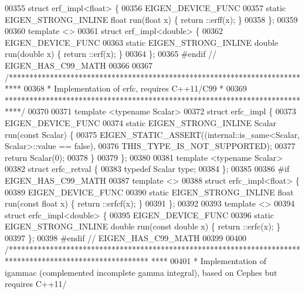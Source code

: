 \begin{DoxyCode}
00355 \textcolor{keyword}{struct }erf\_impl<float> \{
00356   EIGEN\_DEVICE\_FUNC
00357   \textcolor{keyword}{static} EIGEN\_STRONG\_INLINE \textcolor{keywordtype}{float} run(\textcolor{keywordtype}{float} x) \{ return ::erff(x); \}
00358 \};
00359 
00360 \textcolor{keyword}{template} <>
00361 \textcolor{keyword}{struct }erf\_impl<double> \{
00362   EIGEN\_DEVICE\_FUNC
00363   \textcolor{keyword}{static} EIGEN\_STRONG\_INLINE \textcolor{keywordtype}{double} run(\textcolor{keywordtype}{double} x) \{ return ::erf(x); \}
00364 \};
00365 \textcolor{preprocessor}{#endif  // EIGEN\_HAS\_C99\_MATH}
00366 
00367 \textcolor{comment}{/***************************************************************************}
00368 \textcolor{comment}{* Implementation of erfc, requires C++11/C99                               *}
00369 \textcolor{comment}{****************************************************************************/}
00370 
00371 \textcolor{keyword}{template} <\textcolor{keyword}{typename} Scalar>
00372 \textcolor{keyword}{struct }erfc\_impl \{
00373   EIGEN\_DEVICE\_FUNC
00374   \textcolor{keyword}{static} EIGEN\_STRONG\_INLINE Scalar run(\textcolor{keyword}{const} Scalar) \{
00375     EIGEN\_STATIC\_ASSERT((internal::is\_same<Scalar, Scalar>::value == \textcolor{keyword}{false}),
00376                         THIS\_TYPE\_IS\_NOT\_SUPPORTED);
00377     \textcolor{keywordflow}{return} Scalar(0);
00378   \}
00379 \};
00380 
00381 \textcolor{keyword}{template} <\textcolor{keyword}{typename} Scalar>
00382 \textcolor{keyword}{struct }erfc\_retval \{
00383   \textcolor{keyword}{typedef} Scalar type;
00384 \};
00385 
00386 \textcolor{preprocessor}{#if EIGEN\_HAS\_C99\_MATH}
00387 \textcolor{keyword}{template} <>
00388 \textcolor{keyword}{struct }erfc\_impl<float> \{
00389   EIGEN\_DEVICE\_FUNC
00390   \textcolor{keyword}{static} EIGEN\_STRONG\_INLINE \textcolor{keywordtype}{float} run(\textcolor{keyword}{const} \textcolor{keywordtype}{float} x) \{ return ::erfcf(x); \}
00391 \};
00392 
00393 \textcolor{keyword}{template} <>
00394 \textcolor{keyword}{struct }erfc\_impl<double> \{
00395   EIGEN\_DEVICE\_FUNC
00396   \textcolor{keyword}{static} EIGEN\_STRONG\_INLINE \textcolor{keywordtype}{double} run(\textcolor{keyword}{const} \textcolor{keywordtype}{double} x) \{ return ::erfc(x); \}
00397 \};
00398 \textcolor{preprocessor}{#endif  // EIGEN\_HAS\_C99\_MATH}
00399 
00400 \textcolor{comment}{/**********************************************************************************************************
      ****}
00401 \textcolor{comment}{ * Implementation of igammac (complemented incomplete gamma integral), based on Cephes but requires C++11/
}
\end{DoxyCode}
